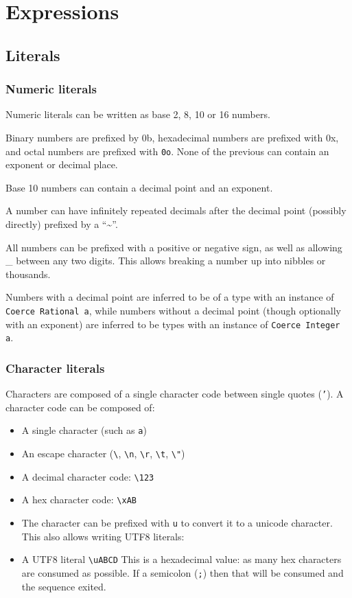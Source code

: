 \section{Expressions}

\subsection{Literals}
\subsubsection{Numeric literals}
Numeric literals can be written as base 2, 8, 10 or 16 numbers.

Binary numbers are prefixed by 0b, hexadecimal numbers are prefixed with 0x, and octal numbers are prefixed with \texttt{0o}. None of the previous can contain an exponent or decimal place.

Base 10 numbers can contain a decimal point and an exponent.

A number can have infinitely repeated decimals after the decimal point (possibly directly) prefixed by a ``\textasciitilde{}''.

All numbers can be prefixed with a positive or negative sign, as well as allowing _ between any two digits. This allows breaking a number up into nibbles or thousands.

Numbers with a decimal point are inferred to be of a type with an instance of \texttt{Coerce Rational a}, while numbers without a decimal point (though optionally with an exponent) are inferred to be types with an instance of \texttt{Coerce Integer a}.

\subsubsection{Character literals}
Characters are composed of a single character code between single quotes (\texttt{'}). A character code can be composed of:

\begin{itemize}
\item A single character (such as \texttt{a})
\item An escape character (\texttt{\textbackslash\textquotesingle}, \texttt{\textbackslash n}, \texttt{\textbackslash r}, \texttt{\textbackslash t}, \texttt{\textbackslash "})
\item A decimal character code: \texttt{\textbackslash 123}
\item A hex character code: \texttt{\textbackslash xAB}
\item The character can be prefixed with \texttt{u} to convert it to a unicode character. This also allows writing UTF8 literals:
\item A UTF8 literal \texttt{\textbackslash uABCD} This is a hexadecimal value: as many hex characters are consumed as possible. If a semicolon (\texttt{;}) then that will be consumed and the sequence exited.
\end{itemize}

